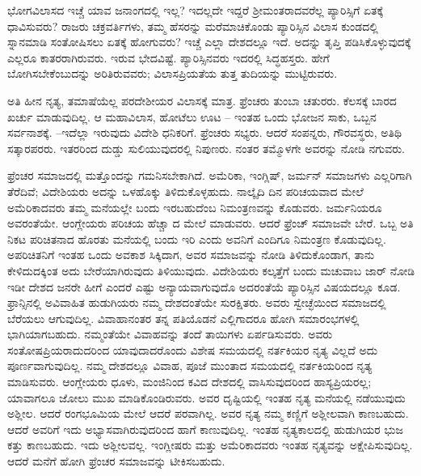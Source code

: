 ಭೋಗವಿಲಾಸದ ಇಚ್ಚೆ ಯಾವ ಜನಾಂಗದಲ್ಲಿ ಇಲ್ಲ? ಇದಲ್ಲದೇ ಇದ್ದರೆ ಶ‍್ರೀಮಂತ\break ರಾದವರೆಲ್ಲ ಪ್ಯಾರಿಸ್ಸಿಗೆ ಏತಕ್ಕೆ ಧಾವಿಸುವರು? ರಾಜರು ಚಕ್ರವರ್ತಿಗಳು, ತಮ್ಮ ಹೆಸರನ್ನು ಮರೆಮಾಚಿಕೊಂಡು ಪ್ಯಾರಿಸ್ಸಿನ ವಿಲಾಸ ಕುಂಡದಲ್ಲಿ ಸ್ನಾನಮಾಡಿ ಸಂತೋಷಿಸಲು ಏತಕ್ಕೆ ಹೋಗುವರು? ಇಚ್ಚೆ ಎಲ್ಲಾ ದೇಶದಲ್ಲೂ ಇದೆ. ಅದನ್ನು ತೃಪ್ತಿ ಪಡಿಸಿಕೊಳ್ಳುವುದಕ್ಕೆ ಎಲ್ಲರೂ ಕಾತರರಾಗಿರುವರು. ಇರುವ ಭೇದವಿಷ್ಟೆ. ಪ್ಯಾರಿಸ್ಸಿನವರು ಇದರಲ್ಲಿ ಸಿದ್ಧಹಸ್ತರು. ಹೇಗೆ ಬೋಗಿಸಬೇಕೆಂಬುದನ್ನು ಅರಿತಿರುವವರು; ವಿಲಾಸಪ್ರಿಯತೆಯ ತುತ್ತ ತುದಿಯನ್ನು ಮುಟ್ಟಿರುವರು.

\vskip 5pt

ಅತಿ ಹೀನ ನೃತ್ಯ, ತಮಾಷೆಯೆಲ್ಲ ಪರದೇಶೀಯರ ವಿಲಾಸಕ್ಕೆ ಮಾತ್ರ. ಫ್ರೆಂಚರು ತುಂಬಾ ಚತುರರು. ಕೆಲಸಕ್ಕೆ ಬಾರದ ಖರ್ಚು ಮಾಡುವುದಿಲ್ಲ. ಆ ಮಹಾವಿಲಾಸ, ಹೋಟೆಲು ಊಟ – ಇಂತಹ ಒಂದು ಭೋಜನ ಸಾಕು, ಒಬ್ಬನ ಸರ್ವನಾಶಕ್ಕೆ. –ಇದೆಲ್ಲಾ ಇರುವುದು ವಿದೇಶಿ ಧನಿಕರಿಗೆ. ಫ್ರೆಂಚರು ಸಭ್ಯರು. ಆದರೆ ಸಂಪನ್ನರು, ಗೌರವಸ್ಥರು, ಅತಿಥಿ ಸತ್ಕಾರಪರರು. ಇತರರಿಂದ ದುಡ್ಡು ಸುಲಿಯುವುದರಲ್ಲಿ ನಿಪುಣರು. ನಂತರ ತಮ್ಮೊಳಗೇ ಅವರನ್ನು ನೋಡಿ ನಗುವರು.

\vskip 5pt

ಫ್ರೆಂಚರ ಸಮಾಜದಲ್ಲಿ ಮತ್ತೊಂದನ್ನು ಗಮನಿಸಬೇಕಾಗಿದೆ. ಅಮೆರಿಕಾ, ಇಂಗ್ಲಿಷ್​, ಜರ್ಮನ್​ ಸಮಾಜಗಳು ಎಲ್ಲರಿಗಾಗಿ ತೆರೆದಿವೆ; ವಿದೇಶಿಯರು ಅದನ್ನು ಒಳಹೊಕ್ಕು ತಿಳಿದುಕೊಳ್ಳಹುದು. ನಾಲ್ಕೈದಿ ದಿನ ಪರಿಚಯವಾದ ಮೇಲೆ ಅಮೆರಿಕಾದವರು ತಮ್ಮ ಮನೆಯಲ್ಲೇ ಬಂದು ಇರಬಹುದೆಂಬ ನಿಮಂತ್ರಣವನ್ನು ಕೊಡುವರು. ಜರ್ಮನಿಯರೂ ಅವರಂತೆಯೇ. ಆಂಗ್ಲೇಯರು ಪರಿಚಯ ಹೆಚ್ಚಾ ದ ಮೇಲೆ ಮಾಡುವರು. ಆದರೆ ಫ್ರೆಂಚ್​ ಸಮಾಜವೇ ಬೇರೆ. ಒಬ್ಬ ಅತಿ ನಿಕಟ ಪರಿಚಿತನಾದ ಹೊರತು ಮನೆಯಲ್ಲಿ ಬಂದು ಇರಿ ಎಂದು ಅವನಿಗೆ ಎಂದಿಗೂ ನಿಮಂತ್ರಣ ಕೊಡುವುದಿಲ್ಲ. ಅಪರಿಚಿತನಿಗೆ ಇಂತಹ ಒಂದು ಅವಕಾಶ ಸಿಕ್ಕಿದಾಗ, ಅವರ ಸಮಾಜವನ್ನು ನೋಡಿ ತಿಳಿದುಕೊಂಡಾಗ, ತಾನು ಕೇಳಿದುದಕ್ಕಿಂತ ಅದು ಬೇರೆಯಾಗಿರುವುದು ತಿಳಿಯುವುದು. ವಿದೇಶಿಯರು ಕಲ್ಕತ್ತೆಗೆ ಬಂದು ಮಚುವಾಬ ಜಾರ್​ ನೋಡಿ ಇಡೀ ದೇಶದ ಜನರೇ ಹೀಗೆ ಎಂದರೆ ಎಷ್ಟು ಅನ್ಯಾಯವಾಗುವುದೊ ಅದರಂತೆಯೆ ಪ್ಯಾರಿಸ್ಸಿನ ವಿಷಯದಲ್ಲೂ ಕೂಡ. ಫ್ರಾನ್ಸಿನಲ್ಲಿ ಅವಿವಾಹಿತ ಹುಡುಗಿಯರು ನಮ್ಮ ದೇಶದಂತೆಯೇ ಸುರಕ್ಷಿತರು. ಅವರು ಸ್ವೇಚ್ಛೆಯಿಂದ ಸಮಾಜದಲ್ಲಿ ಬೆರೆಯಲು ಆಗುವುದಿಲ್ಲ. ವಿವಾಹಾನಂತರ ತನ್ನ ಪತಿಯೊಡನೆ ಎಲ್ಲಿಗಾದರೂ ಹೋಗಿ ಸಮಾರಂಭಗಳಲ್ಲಿ ಭಾಗಿಯಾಗಬಹುದು. ನಮ್ಮಂತೆಯೇ ವಿವಾಹವನ್ನು ತಂದೆ ತಾಯಿಗಳು ಏರ್ಪಡಿಸುವರು. ಅವರು ಸಂತೋಷಪ್ರಿಯರಾದುದರಿಂದ ಯಾವುದಾದರೊಂದು ವಿಶೇಷ ಸಮಯದಲ್ಲಿ ನರ್ತಕಿಯರ ನೃತ್ಯ ವಿಲ್ಲದೆ ಅದು ಪೂರ್ಣವಾಗುವುದಿಲ್ಲ. ನಮ್ಮ ದೇಶದಲ್ಲೂ ವಿವಾಹ, ಪೂಜೆ ಮುಂತಾದ ಸಮಯದಲ್ಲಿ ನರ್ತಕಿಯರಿಂದ ನೃತ್ಯ ಮಾಡಿಸುವರು. ಆಂಗ್ಲೇಯರು ಧೂಳು, ಮಂಜಿನಿಂದ ಕವಿದ ದೇಶದಲ್ಲಿ ವಾಸಿಸುವುದರಿಂದ ಹಾಸ್ಯಪ್ರಿಯರಲ್ಲ; ಯಾವಾಗಲೂ ಜೋಲು ಮುಖ ಮಾಡಿಕೊಂಡಿರುವರು. ಅವರ ದೃಷ್ಟಿಯಲ್ಲಿ ಇಂತಹ ನೃತ್ಯ ಮನೆಯಲ್ಲಿ ನಡೆಯುವುದು ಅಶ್ಲೀಲ. ಆದರೆ ರಂಗಭೂಮಿಯ ಮೇಲೆ ಆದರೆ ಪರವಾಗಿಲ್ಲ. ಅವರ ನೃತ್ಯ ನಮ್ಮ ಕಣ್ಣಿಗೆ ಅಶ್ಲೀಲವಾಗಿ ಕಾಣಬಹುದು. ಆದರೆ ಅವರಿಗೆ ಇದು ಅಭ್ಯಾಸವಾಗಿರುವುದರಿಂದ ಹಾಗೆ ಕಾಣುವುದಿಲ್ಲ. ಇಂತಹ ನೃತ್ಯಕಾಲದಲ್ಲಿ ಹುಡುಗಿಯರ ಭುಜ ಕತ್ತು ಕಾಣಬಹುದು. ಇದು ಅಶ್ಲೀಲವಲ್ಲ. ಇಂಗ್ಲೀಷರು ಮತ್ತು ಅಮೆರಿಕಾದವರು ಇಂತಹ ನೃತ್ಯವನ್ನು ಅಕ್ಷೇಪಿಸುವುದಿಲ್ಲ. ಆದರೆ ಮನೆಗೆ ಹೋಗಿ ಫ್ರೆಂಚರ ಸಮಾಜವನ್ನು ಟೀಕಿಸಬಹುದು.


